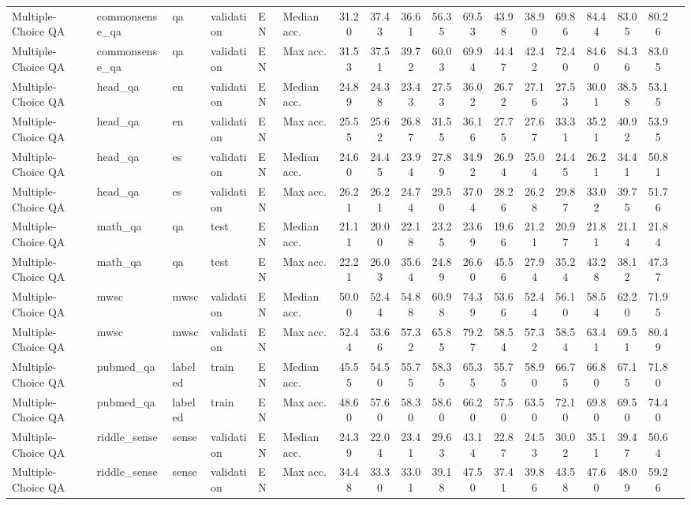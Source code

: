 \documentclass[11pt]{article}
\begin{document}
\begin{table*}[ht]
\begin{minipage}{\pdfpagewidth}
{\begin{tabular}{llllll|ccccc|ccccccc}
Multiple-Choice QA & commonsense\_qa & qa & validation & EN & Median acc. & 31.20 & 37.43 & 36.61 & 56.35 & 69.53 & 43.98 & 38.90 & 69.86 & 84.44 & 83.05 & 80.26\\
Multiple-Choice QA & commonsense\_qa & qa & validation & EN & Max acc. & 31.53 & 37.51 & 39.72 & 60.03 & 69.94 & 44.47 & 42.42 & 72.40 & 84.60 & 84.36 & 83.05\\
Multiple-Choice QA & head\_qa & en & validation & EN & Median acc. & 24.89 & 24.38 & 23.43 & 27.53 & 36.02 & 26.72 & 27.16 & 27.53 & 30.01 & 38.58 & 53.15\\
Multiple-Choice QA & head\_qa & en & validation & EN & Max acc. & 25.55 & 25.62 & 26.87 & 31.55 & 36.16 & 27.75 & 27.67 & 33.31 & 35.21 & 40.92 & 53.95\\
Multiple-Choice QA & head\_qa & es & validation & EN & Median acc. & 24.60 & 24.45 & 23.94 & 27.89 & 34.92 & 26.94 & 25.04 & 24.45 & 26.21 & 34.41 & 50.81\\
Multiple-Choice QA & head\_qa & es & validation & EN & Max acc. & 26.21 & 26.21 & 24.74 & 29.50 & 37.04 & 28.26 & 26.28 & 29.87 & 33.02 & 39.75 & 51.76\\
Multiple-Choice QA & math\_qa & qa & test & EN & Median acc. & 21.11 & 20.00 & 22.18 & 23.25 & 23.69 & 19.66 & 21.21 & 20.97 & 21.81 & 21.14 & 21.84\\
Multiple-Choice QA & math\_qa & qa & test & EN & Max acc. & 22.21 & 26.03 & 35.64 & 24.89 & 26.60 & 45.56 & 27.94 & 35.24 & 43.28 & 38.12 & 47.37\\
Multiple-Choice QA & mwsc & mwsc & validation & EN & Median acc. & 50.00 & 52.44 & 54.88 & 60.98 & 74.39 & 53.66 & 52.44 & 56.10 & 58.54 & 62.20 & 71.95\\
Multiple-Choice QA & mwsc & mwsc & validation & EN & Max acc. & 52.44 & 53.66 & 57.32 & 65.85 & 79.27 & 58.54 & 57.32 & 58.54 & 63.41 & 69.51 & 80.49\\
Multiple-Choice QA & pubmed\_qa & labeled & train & EN & Median acc. & 45.55 & 54.50 & 55.75 & 58.35 & 65.35 & 55.75 & 58.90 & 66.75 & 66.80 & 67.15 & 71.80\\
Multiple-Choice QA & pubmed\_qa & labeled & train & EN & Max acc. & 48.60 & 57.60 & 58.30 & 58.60 & 66.20 & 57.50 & 63.50 & 72.10 & 69.80 & 69.50 & 74.40\\
Multiple-Choice QA & riddle\_sense & sense & validation & EN & Median acc. & 24.39 & 22.04 & 23.41 & 29.63 & 43.14 & 22.87 & 24.53 & 30.02 & 35.11 & 39.47 & 50.64\\
Multiple-Choice QA & riddle\_sense & sense & validation & EN & Max acc. & 34.48 & 33.30 & 33.01 & 39.18 & 47.50 & 37.41 & 39.86 & 43.58 & 47.60 & 48.09 & 59.26\\

\end{tabular}}
\end{minipage}
\end{table*}
\end{document}
